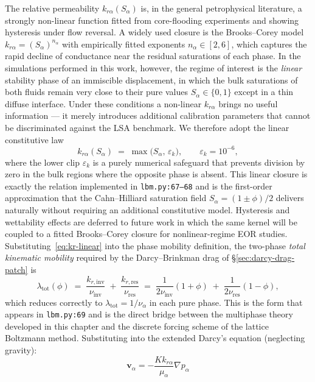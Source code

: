 The relative permeability $k_{r\alpha}(S_\alpha)$ is, in the general petrophysical literature, a strongly non-linear function fitted from core-flooding experiments and showing hysteresis under flow reversal. A widely used closure is the Brooks--Corey model $k_{r\alpha} = (S_\alpha)^{n_\alpha}$ with empirically fitted exponents $n_\alpha \in [2, 6]$, which captures the rapid decline of conductance near the residual saturations of each phase.
In the simulations performed in this work, however, the regime of interest is the \emph{linear} stability phase of an immiscible displacement, in which the bulk saturations of both fluids remain very close to their pure values $S_\alpha \in \{0, 1\}$ except in a thin diffuse interface.
Under these conditions a non-linear $k_{r\alpha}$ brings no useful information --- it merely introduces additional calibration parameters that cannot be discriminated against the LSA benchmark.
We therefore adopt the linear constitutive law
\begin{equation}
k_{r\alpha}(S_\alpha) \;=\; \max\!\bigl(S_\alpha,\,\varepsilon_k\bigr),
\qquad \varepsilon_k = 10^{-6},
\label{eq:kr-linear}
\end{equation}
where the lower clip $\varepsilon_k$ is a purely numerical safeguard that prevents division by zero in the bulk regions where the opposite phase is absent.
This linear closure is exactly the relation implemented in \texttt{lbm.py:67--68} and is the first-order approximation that the Cahn--Hilliard saturation field $S_\alpha = (1\pm\phi)/2$ delivers naturally without requiring an additional constitutive model.
Hysteresis and wettability effects are deferred to future work in which the same kernel will be coupled to a fitted Brooks--Corey closure for nonlinear-regime EOR studies.
Substituting~\eqref{eq:kr-linear} into the phase mobility definition, the two-phase \emph{total kinematic mobility} required by the Darcy--Brinkman drag of \S\ref{sec:darcy-drag-patch} is
\begin{equation}
\lambda_{\mathrm{tot}}(\phi)
\;=\; \frac{k_{r,\mathrm{inv}}}{\nu_{\mathrm{inv}}}
\;+\; \frac{k_{r,\mathrm{res}}}{\nu_{\mathrm{res}}}
\;=\; \frac{1}{2\nu_{\mathrm{inv}}}(1+\phi)
\;+\; \frac{1}{2\nu_{\mathrm{res}}}(1-\phi),
\label{eq:lambda-tot}
\end{equation}
which reduces correctly to $\lambda_{\mathrm{tot}} = 1/\nu_\alpha$ in each pure phase.
This is the form that appears in \texttt{lbm.py:69} and is the direct bridge between the multiphase theory developed in this chapter and the discrete forcing scheme of the lattice Boltzmann method.
Substituting into the extended Darcy's equation (neglecting gravity):
\begin{equation}
    \mathbf{v}_\alpha = -\frac{K k_{r\alpha}}{\mu_\alpha} \nabla p_\alpha
\end{equation}

